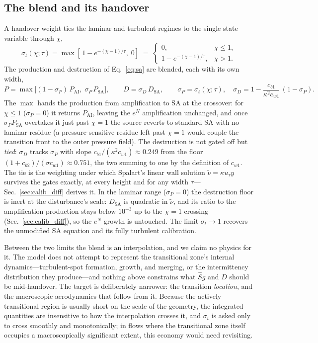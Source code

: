\documentclass[journal]{new-aiaa}
\begin{document}
\subsection{The blend and its handover}\label{sec:blend}\label{sec:calib_diff}
A handover weight ties the laminar and turbulent regimes to the single state
variable through $\chi$,
\begin{equation}
  \sigma_t(\chi;\tau) = \max\!\left[\,1-e^{-(\chi-1)/\tau},\;0\right] \;=\;
  \begin{cases} 0, & \chi \le 1, \\ 1-e^{-(\chi-1)/\tau}, & \chi > 1. \end{cases}
  \label{eq:sigma}
\end{equation}
The
production and destruction of Eq.~\eqref{eq:sa} are blended, each with its own
width,
\begin{equation}
  P = \max\!\big[(1-\sigma_P)\,P_\mathrm{AI},\;\sigma_P\,P_\mathrm{SA}\big], \qquad
  D = \sigma_D\,D_\mathrm{SA}, \qquad
  \sigma_P = \sigma_t(\chi;\tau), \quad
  \sigma_D = 1-\frac{c_{b1}}{\kappa^2c_{w1}}\,(1-\sigma_P).
  \label{eq:blend}
\end{equation}
The $\max$ hands the production from amplification to SA at the
crossover: for $\chi\!\le\!1$ ($\sigma_P\!=\!0$) it returns $P_\mathrm{AI}$,
leaving the $e^N$ amplification unchanged, and once $\sigma_P P_\mathrm{SA}$
overtakes it just past $\chi\!=\!1$ the source reverts to standard SA with no
laminar residue (a pressure-sensitive residue left past $\chi\!=\!1$ would couple
the transition front to the outer pressure field).
The destruction is not gated off but \emph{tied}: $\sigma_D$ tracks
$\sigma_P$ with slope $c_{b1}/(\kappa^2c_{w1})\!\approx\!0.249$ from the
floor $(1+c_{b2})/(\sigma c_{w1})\!\approx\!0.751$, the two summing to one
by the definition of $c_{w1}$. The tie is the weighting under which
Spalart's linear wall solution
$\tilde\nu\!=\!\kappa u_\tau y$ survives the gates exactly, at every
height and for any width $\tau$---Sec.~\ref{sec:calib_diff} derives it. In
the laminar range ($\sigma_P\!=\!0$) the destruction floor is inert at the
disturbance's scale: $D_\mathrm{SA}$ is quadratic in $\tilde\nu$, and its
ratio to the amplification production stays below $10^{-3}$ up to the
$\chi\!=\!1$ crossing (Sec.~\ref{sec:calib_diff}), so the $e^N$ growth is
untouched. The limit $\sigma_t\!\to\!1$ recovers the unmodified SA
equation and its fully turbulent calibration.

Between the two limits the blend is an interpolation, and we claim no
physics for it. The model does not attempt to represent the transitional
zone's internal dynamics---turbulent-spot formation, growth, and
merging, or the intermittency distribution they produce---and nothing
above constrains what $\hat S g$ and $D$ should be mid-handover. The target is
deliberately narrower: the transition \emph{location}, and the
macroscopic aerodynamics that follow from it. Because the actively
transitional region is usually short on the scale of the geometry, the
integrated quantities are insensitive to how the interpolation crosses
it, and $\sigma_t$ is asked only to cross smoothly and monotonically;
in flows where the transitional zone itself occupies a macroscopically
significant extent, this economy would need revisiting.
\end{document}
